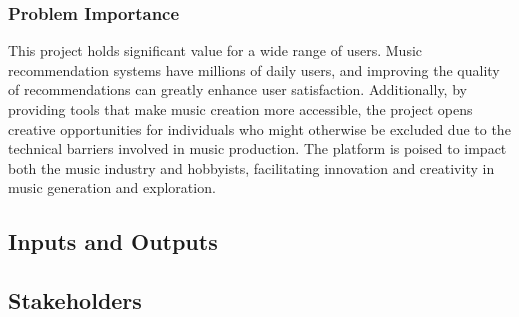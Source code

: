 \documentclass{article}
\begin{document}
\subsubsection{Problem Importance}

This project holds significant value for a wide range of users. Music recommendation systems have millions of daily users, and improving the quality of recommendations can greatly enhance user satisfaction. Additionally, by providing tools that make music creation more accessible, the project opens creative opportunities for individuals who might otherwise be excluded due to the technical barriers involved in music production. The platform is poised to impact both the music industry and hobbyists, facilitating innovation and creativity in music generation and exploration.

\subsection{Inputs and Outputs}


\subsection{Stakeholders}
\end{document}
